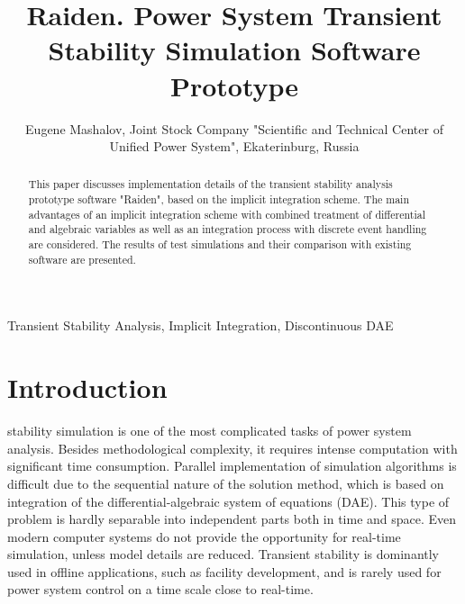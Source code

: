\documentclass[lettersize,journal]{IEEEtran}
\begin{document}
\title{Raiden. Power System Transient Stability Simulation Software Prototype}

\author {Eugene Mashalov, Joint Stock Company "Scientific and Technical Center of Unified Power System", Ekaterinburg, Russia}




\maketitle

\begin{abstract}
This paper discusses implementation details of the transient stability analysis prototype software "Raiden", based on the implicit integration scheme. The main advantages of an implicit integration scheme with combined treatment of differential and algebraic variables as well as an integration process with discrete event handling are considered. The results of test simulations and their comparison with existing software are presented.
\end{abstract}

\begin{IEEEkeywords}
Transient Stability Analysis, Implicit Integration, Discontinuous DAE
\end{IEEEkeywords}

\section{Introduction}
 stability simulation is one of the most complicated tasks of power system analysis. Besides methodological complexity, it requires intense computation with significant time consumption. Parallel implementation of simulation algorithms is difficult due to the sequential nature of the solution method, which is based on integration of the differential-algebraic system of equations (DAE). This type of problem is hardly separable into independent parts both in time and space. Even modern computer systems do not provide the opportunity for real-time simulation, unless model details are reduced. Transient stability is dominantly used in offline applications, such as facility development, and is rarely used for power system control on a time scale close to real-time.
\end{document}
